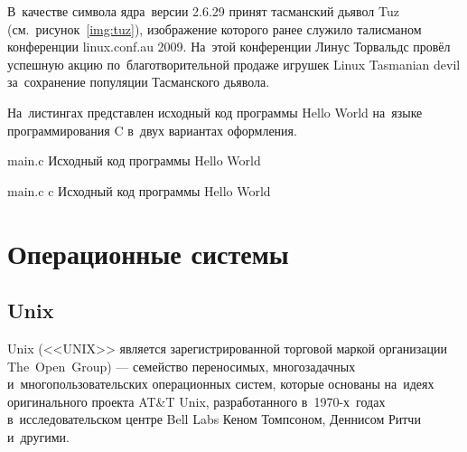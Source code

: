 \documentclass{bmstu}
\begin{document}
В~качестве символа ядра~версии 2.6.29 принят тасманский дьявол Tuz (см.~рисунок~\ref{img:tuz}), изображение которого ранее служило талисманом конференции linux.conf.au 2009.
На~этой конференции Линус Торвальдс провёл успешную акцию по~благотворительной продаже игрушек Linux Tasmanian devil за~сохранение популяции Тасманского дьявола. \newpage







На~листингах представлен исходный код программы Hello World на~языке программирования C в~двух вариантах оформления.

    {main.c} %
    {Исходный код программы Hello World} %

    {main.c} %
    {c} %
    {Исходный код программы Hello World} %


\chapter{Операционные системы}

\section{Unix}

Unix (<<UNIX>> является зарегистрированной торговой маркой организации The~Open~Group) --- семейство переносимых, многозадачных и~многопользовательских операционных систем, которые основаны на~идеях оригинального проекта AT\&T Unix, разработанного в~1970-х~годах в~исследовательском центре Bell Labs Кеном Томпсоном, Деннисом Ритчи и~другими.
\end{document}
